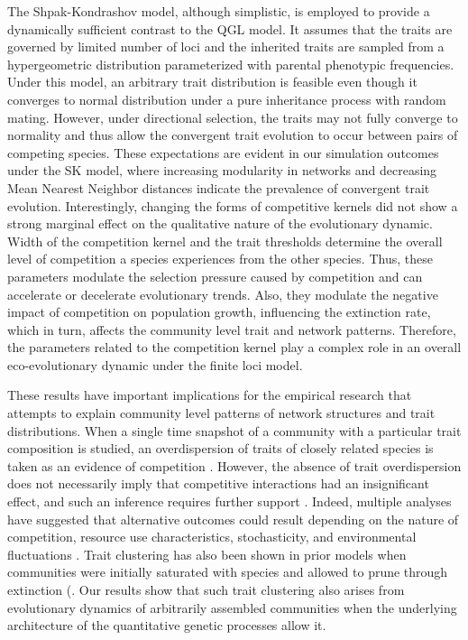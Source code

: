 \documentclass[12pt]{article}
\begin{document}
The Shpak-Kondrashov model, although simplistic, is employed to provide a dynamically sufficient contrast to the QGL model\cite{Shpak1999}. It assumes that the traits are governed by limited number of loci and the inherited traits are sampled from a hypergeometric distribution parameterized with parental phenotypic frequencies. Under this model, an arbitrary trait distribution is feasible even though it converges to normal distribution under a pure inheritance process with random mating. However, under directional selection, the traits may not fully converge to normality and thus allow the convergent trait evolution to occur between pairs of competing species. These expectations are evident in our simulation outcomes under the SK model, where increasing modularity in networks and decreasing Mean Nearest Neighbor distances indicate the prevalence of convergent trait evolution. Interestingly, changing the forms of competitive kernels did not show a strong marginal effect on the qualitative nature of the evolutionary dynamic. Width of the competition kernel and the trait thresholds determine the overall level of competition a species experiences from the other species. Thus, these parameters modulate the selection pressure caused by competition and can accelerate or decelerate evolutionary trends. Also, they modulate the negative impact of competition on population growth, influencing the extinction rate, which in turn, affects the community level trait and network patterns. Therefore, the parameters related to the competition kernel play a complex role in an overall eco-evolutionary dynamic under the finite loci model.\par

These results have important implications for the empirical research that attempts to explain community level patterns of network structures and trait distributions. When a single time snapshot of a community with a particular trait composition is studied, an overdispersion of traits of closely related species is taken as an evidence of competition \cite[][etc.]{kraft2010functional,baraloto2012using,lessard2012inferring}. However, the absence of trait overdispersion does not necessarily imply that competitive interactions had an insignificant effect, and such an inference requires further support \cite{mayfield2010opposing,barabas2016effect}. Indeed, multiple analyses have suggested that alternative outcomes could result depending on the nature of competition, resource use characteristics, stochasticity, and environmental fluctuations \cite[e.g.][]{Abrams1983,Roughgarden1983,macarthur1967limiting}. Trait clustering has also been shown in prior models when communities were initially saturated with species and allowed to prune through extinction (\cite{Scheffer2006}. Our results show that such trait clustering also arises from evolutionary dynamics of arbitrarily assembled communities when the underlying architecture of the quantitative genetic processes allow it.\par
\end{document}
